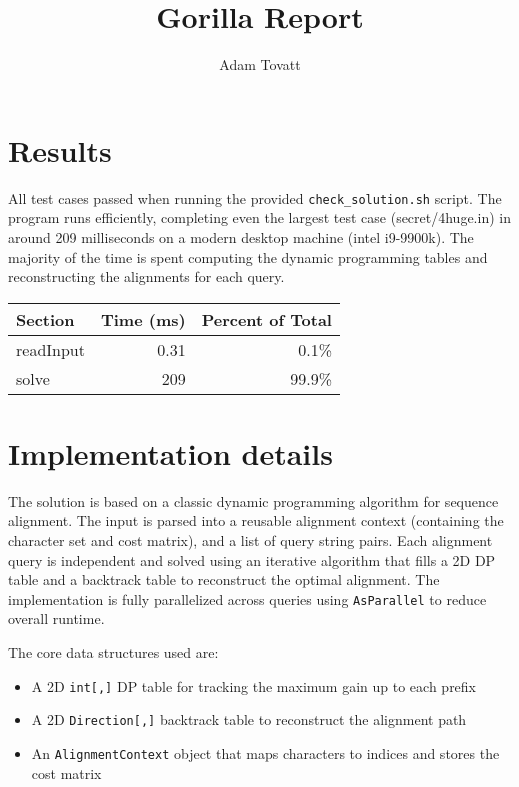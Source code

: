 \documentclass{article}
\title{Gorilla Report}
\author{Adam Tovatt}
\begin{document}
\maketitle

\section{Results}

All test cases passed when running the provided \texttt{check\_solution.sh} script. The program runs efficiently, completing even the largest test case (secret/4huge.in) in around 209 milliseconds on a modern desktop machine (intel i9-9900k). The majority of the time is spent computing the dynamic programming tables and reconstructing the alignments for each query.\\ 

\begin{tabular}{lrr}
\textbf{Section} & \textbf{Time (ms)} & \textbf{Percent of Total} \\
\hline
readInput & 0.31  & 0.1\% \\
solve     & 209   & 99.9\% \\
\end{tabular}

  \clearpage
  \section{Implementation details}

The solution is based on a classic dynamic programming algorithm for sequence alignment. The input is parsed into a reusable alignment context (containing the character set and cost matrix), and a list of query string pairs. Each alignment query is independent and solved using an iterative algorithm that fills a 2D DP table and a backtrack table to reconstruct the optimal alignment. The implementation is fully parallelized across queries using \texttt{AsParallel} to reduce overall runtime.

The core data structures used are:
\begin{itemize}
  \item A 2D \texttt{int[,]} DP table for tracking the maximum gain up to each prefix
  \item A 2D \texttt{Direction[,]} backtrack table to reconstruct the alignment path
  \item An \texttt{AlignmentContext} object that maps characters to indices and stores the cost matrix
\end{itemize}
\end{document}
